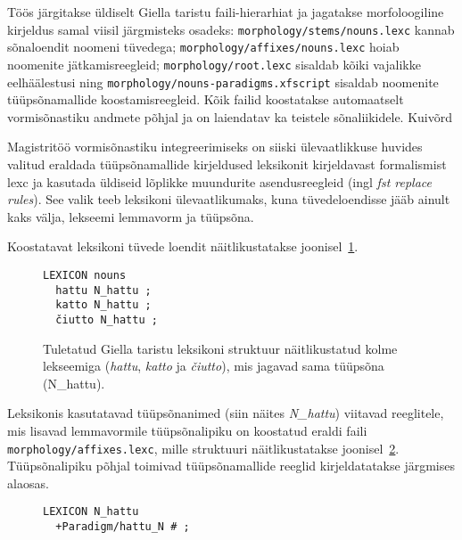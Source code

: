 \documentclass[12pt,a4paper]{article}
\begin{document}
Töös järgitakse üldiselt Giella taristu faili-hierarhiat ja jagatakse morfoloogiline kirjeldus samal viisil järgmisteks osadeks: \texttt{morphology/stems/nouns.lexc} kannab sõna\-loendit noomeni tüvedega; \texttt{morphology/affixes/nouns.lexc} hoiab noomenite jätkamis\-reegleid; \texttt{morphology/root.lexc} sisaldab kõiki vajalikke eel\-häälestusi ning \texttt{morphology/nouns-paradigms.xfscript} sisaldab noomenite tüüpsõna\-mallide koostamis\-reegleid. Kõik failid koostatakse automaatselt vormi\-sõnastiku andmete põhjal ja on laiendatav ka teistele sõna\-liikidele. Kuivõrd 

Magistritöö vormisõnastiku integreerimiseks on siiski ülevaatlikkuse huvides valitud eraldada tüüpsõna\-mallide kirjeldused leksikonit kirjeldavast formalismist lexc ja kasutada üldiseid lõplikke muundurite asendus\-reegleid (ingl \textit{fst replace rules}). See valik teeb leksikoni ülevaatlikumaks, kuna tüvede\-loendisse jääb ainult kaks välja, lekseemi lemma\-vorm ja tüüpsõna.

Koostatavat leksikoni tüvede loendit näitlikustatakse joonisel~\ref{code:giella-lexicon}. 

\begin{figure}[H]
  \center
\begin{verbatim}
LEXICON nouns
  hattu N_hattu ;
  katto N_hattu ;
  čiutto N_hattu ;
\end{verbatim}
\caption{Tuletatud Giella taristu leksikoni struktuur näitlikustatud kolme lekseemiga (\textit{hattu}, \textit{katto} ja \textit{čiutto}), mis jagavad sama tüüp\-sõna (N\_hattu).
  \label{code:giella-lexicon}}
\end{figure}

Leksikonis kasutatavad tüüpsõnanimed (siin näites \textit{N\_hattu}) viitavad reeglitele, mis lisavad lemma\-vormile tüüpsõna\-lipiku on koostatud eraldi faili \texttt{morphology/affixes.lexc}, mille struktuuri näitlikustatakse joonisel~\ref{code:giella-affixes}. Tüüpsõna\-lipiku põhjal toimivad tüüpsõna\-mallide reeglid kirjeldatatakse järgmises alaosas.

\begin{figure}[H]
  \center
\begin{verbatim}
LEXICON N_hattu
  +Paradigm/hattu_N # ;
\end{verbatim}
\caption{
  \label{code:giella-affixes}}
\end{figure}
\end{document}
